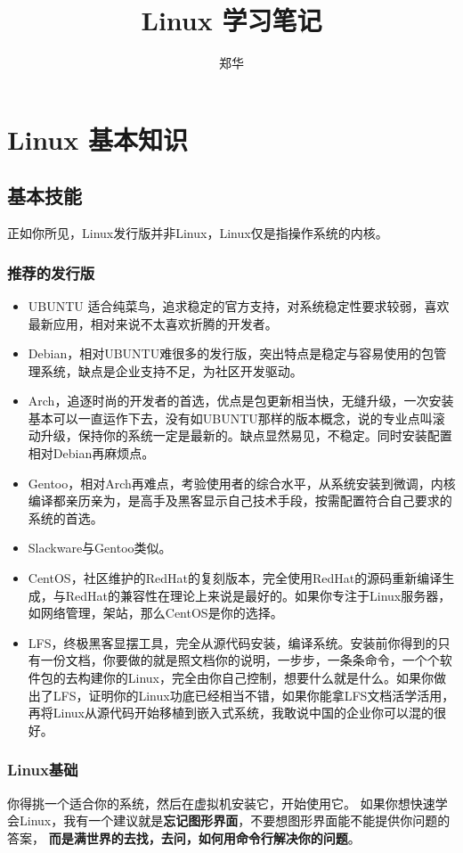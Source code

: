 \documentclass[UTF8,a4paper,12pt]{ctexbook}
\author{\kaishu 郑华}
\title{\heiti Linux 学习笔记}
\begin{document}
 	\maketitle
 	\tableofcontents
 	
 \chapter{Linux 基本知识} 
	 \section{基本技能}
		 正如你所见，Linux发行版并非Linux，Linux仅是指操作系统的内核。

		 \subsection{推荐的发行版}
		 \begin{itemize}
			 \item UBUNTU 适合纯菜鸟，追求稳定的官方支持，对系统稳定性要求较弱，喜欢最新应用，相对来说不太喜欢折腾的开发者。
			 \item Debian，相对UBUNTU难很多的发行版，突出特点是稳定与容易使用的包管理系统，缺点是企业支持不足，为社区开发驱动。
			 \item Arch，追逐时尚的开发者的首选，优点是包更新相当快，无缝升级，一次安装基本可以一直运作下去，没有如UBUNTU那样的版本概念，说的专业点叫滚动升级，保持你的系统一定是最新的。缺点显然易见，不稳定。同时安装配置相对Debian再麻烦点。
			 \item Gentoo，相对Arch再难点，考验使用者的综合水平，从系统安装到微调，内核编译都亲历亲为，是高手及黑客显示自己技术手段，按需配置符合自己要求的系统的首选。
			 \item Slackware与Gentoo类似。
			 \item CentOS，社区维护的RedHat的复刻版本，完全使用RedHat的源码重新编译生成，与RedHat的兼容性在理论上来说是最好的。如果你专注于Linux服务器，如网络管理，架站，那么CentOS是你的选择。
			 \item LFS，终极黑客显摆工具，完全从源代码安装，编译系统。安装前你得到的只有一份文档，你要做的就是照文档你的说明，一步步，一条条命令，一个个软件包的去构建你的Linux，完全由你自己控制，想要什么就是什么。如果你做出了LFS，证明你的Linux功底已经相当不错，如果你能拿LFS文档活学活用，再将Linux从源代码开始移植到嵌入式系统，我敢说中国的企业你可以混的很好。 
		\end{itemize}
		
		\subsection{Linux基础}
			你得挑一个适合你的系统，然后在虚拟机安装它，开始使用它。 如果你想快速学会Linux，我有一个建议就是\textbf{忘记图形界面}，不要想图形界面能不能提供你问题的答案， \textbf{而是满世界的去找，去问，如何用命令行解决你的问题}。
			
\end{document}
